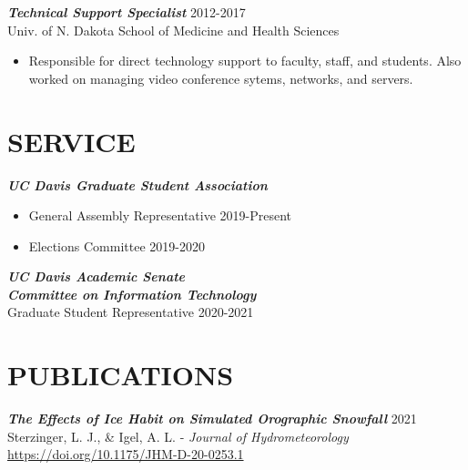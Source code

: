 \documentclass[overlapped]{res}
\begin{document}
\begin{resume}
\begin{itemize}
                \end{itemize}

                {\sl \textbf{Technical Support Specialist}} \hfill 2012-2017 \\
                Univ. of N. Dakota School of Medicine and Health Sciences \\
                \begin{itemize} \itemsep -2pt
                    \item Responsible  for  direct  technology  support  to  faculty,  staff,  and  students.  Also  worked  on managing video conference sytems, networks, and servers.

                \end{itemize}
\section{SERVICE}
                {\sl \textbf{UC Davis Graduate Student Association}} \\
                
                \begin{itemize}
                    \item General Assembly Representative \hfill 2019-Present
                    \item Elections Committee \hfill 2019-2020
                \end{itemize} 

                {\sl \textbf{UC Davis Academic Senate \\ Committee on Information Technology}} \\
                Graduate Student Representative \hfill 2020-2021


\section{PUBLICATIONS}

                {\sl \textbf{The Effects of Ice Habit on Simulated Orographic Snowfall}} 
                \hfill 2021 \\ Sterzinger, L. J., \& Igel, A. L. - \textit{Journal of Hydrometeorology} \\ \href{https://doi.org/10.1175/JHM-D-20-0253.1}{https://doi.org/10.1175/JHM-D-20-0253.1}




\end{resume}
\end{document}
